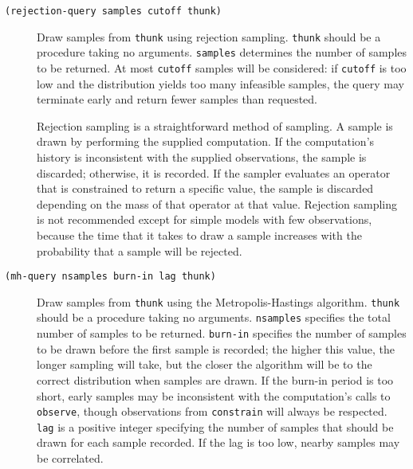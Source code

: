 \documentclass{article}
\begin{document}
\begin{description}

\item[\texttt{(rejection-query samples cutoff thunk)}] \hfill

  Draw samples from \texttt{thunk} using rejection
  sampling. \texttt{thunk} should be a procedure taking no arguments.
  \texttt{samples} determines the number of samples to be returned. At
  most \texttt{cutoff} samples will be considered: if \texttt{cutoff}
  is too low and the distribution yields too many infeasible samples,
  the query may terminate early and return fewer samples than
  requested.

  Rejection sampling is a straightforward method of sampling. A sample
  is drawn by performing the supplied computation. If the
  computation's history is inconsistent with the supplied
  observations, the sample is discarded; otherwise, it is recorded. If
  the sampler evaluates an operator that is constrained to return a
  specific value, the sample is discarded depending on the mass of
  that operator at that value. Rejection sampling is not recommended
  except for simple models with few observations, because the time
  that it takes to draw a sample increases with the probability that a
  sample will be rejected.

\item[\texttt{(mh-query nsamples burn-in lag thunk)}] \hfill

  Draw samples from \texttt{thunk} using the Metropolis-Hastings
  algorithm. \texttt{thunk} should be a procedure taking no
  arguments. \texttt{nsamples} specifies the total number of samples
  to be returned. \texttt{burn-in} specifies the number of samples to
  be drawn before the first sample is recorded; the higher this value,
  the longer sampling will take, but the closer the algorithm will be
  to the correct distribution when samples are drawn. If the burn-in
  period is too short, early samples may be inconsistent with the
  computation's calls to \texttt{observe}, though observations from
  \texttt{constrain} will always be respected. \texttt{lag} is a
  positive integer specifying the number of samples that should be
  drawn for each sample recorded. If the lag is too low, nearby
  samples may be correlated.


\end{description}
\end{document}

